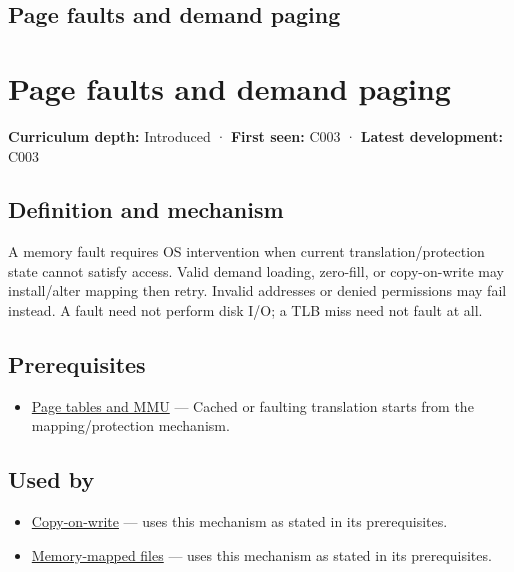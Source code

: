 \hypertarget{appendix-cc0909a7ef14}{}
\section*{Page faults and demand paging}
\chapter{Page faults and demand paging}\label{appendix-cc0909a7ef14-page-faults-and-demand-paging}

\textbf{Curriculum depth:} Introduced · \textbf{First seen:} C003 · \textbf{Latest development:} C003

\section{Definition and mechanism}\label{appendix-cc0909a7ef14-definition-and-mechanism}

A memory fault requires OS intervention when current translation/protection state cannot satisfy access. Valid demand loading, zero-fill, or copy-on-write may install/alter mapping then retry. Invalid addresses or denied permissions may fail instead. A fault need not perform disk I/O; a TLB miss need not fault at all.

\section{Prerequisites}\label{appendix-cc0909a7ef14-prerequisites}

\begin{itemize}
\tightlist
\item
  \hyperref[appendix-01e5905165c4]{Page tables and MMU} --- Cached or faulting translation starts from the mapping/protection mechanism.
\end{itemize}

\section{Used by}\label{appendix-cc0909a7ef14-used-by}

\begin{itemize}
\tightlist
\item
  \hyperref[appendix-7a06e5baac04]{Copy-on-write} --- uses this mechanism as stated in its prerequisites.
\item
  \hyperref[appendix-313ee7a0ba7b]{Memory-mapped files} --- uses this mechanism as stated in its prerequisites.
\end{itemize}

